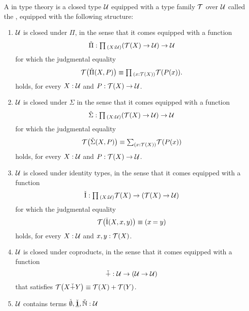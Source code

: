 \begin{defn}
  A  in type theory is a closed type $\mathcal{U}$ equipped with a type family $\mathcal{T}$ over $\mathcal{U}$ called the , equipped with the following structure:
  \begin{enumerate}
  \item $\mathcal{U}$ is closed under $\Pi$, in the sense that it comes equipped with a function
    \begin{equation*}
      \check{\Pi} :\prd{X:\UU}(\Ty(X)\to\UU)\to\UU
    \end{equation*}
    for which the judgmental equality
    \begin{equation*}
      \Ty\big(\check{\Pi}(X,P)\big)\jdeq \prd{x:\Ty(X)}\Ty(P(x)).
    \end{equation*}
    holds, for every $X:\mathcal{U}$ and $P:\mathcal{T}(X)\to\mathcal{U}$.
  \item $\mathcal{U}$ is closed under $\Sigma$ in the sense that it comes equipped with a function
    \begin{equation*}
      \check{\Sigma} :\prd{X:\UU}(\Ty(X)\to\UU)\to\UU
    \end{equation*}
    for which the judgmental equality
    \begin{equation*}
      \Ty\big(\check{\Sigma}(X,P)\big) \jdeq \sm{x:\Ty(X)}\Ty(P(x))
    \end{equation*}
    holds, for every $X:\mathcal{U}$ and $P:\mathcal{T}(X)\to\mathcal{U}$.
  \item $\mathcal{U}$ is closed under identity types, in the sense that it comes equipped with a function
    \begin{equation*}
      \check{\mathrm{I}} : \prd{X:\UU}\Ty(X)\to(\Ty(X)\to\UU)
    \end{equation*}
    for which the judgmental equality
    \begin{equation*}
      \Ty\big(\check{\mathrm{I}}(X,x,y)\big)\jdeq (\id{x}{y})
    \end{equation*}
    holds, for every $X:\mathcal{U}$ and $x,y:\mathcal{T}(X)$.
  \item $\mathcal{U}$ is closed under coproducts, in the sense that it comes equipped with a function
    \begin{equation*}
      \check{+}:\mathcal{U}\to (\mathcal{U}\to\mathcal{U})
    \end{equation*}
    that satisfies $\mathcal{T}\big(X\check{+}Y\big)\equiv \mathcal{T}(X)+\mathcal{T}(Y)$.
  \item $\mathcal{U}$ contains terms $\check{\emptyset},\check{\underline{\mathbf{1}}},\check{{\mathbb{N}}}:\mathcal{U}$

\end{enumerate}
\end{defn}
